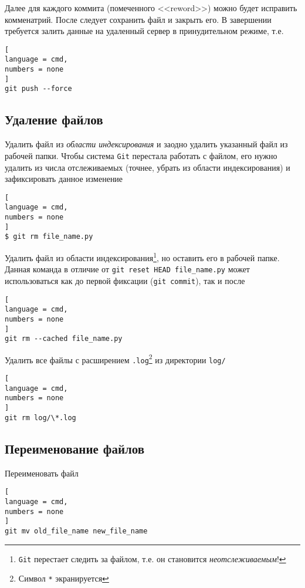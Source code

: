 \documentclass[%
	11pt,
	a4paper,
	utf8,
		]{article}
\begin{document}
Далее для каждого коммита (помеченного <<reword>>) можно будет исправить комменатрий. После следует сохранить файл и закрыть его. В завершении требуется залить данные на удаленный сервер в принудительном режиме, т.е.
\begin{lstlisting}[
language = cmd,
numbers = none
]
git push --force
\end{lstlisting}


\subsection{Удаление файлов}

Удалить файл из \emph{области индексирования} и заодно удалить указанный файл из рабочей папки. Чтобы система \texttt{Git} перестала работать с файлом, его нужно удалить из числа отслеживаемых (точнее, убрать из области индексирования) и зафиксировать данное изменение 

\begin{lstlisting}[
language = cmd,
numbers = none
]
$ git rm file_name.py
\end{lstlisting}


Удалить файл из области индексирования\footnote{\texttt{Git} перестает следить за файлом, т.е. он становится \emph{неотслеживаемым}!}, но оставить его в рабочей папке. Данная команда в отличие от \texttt{git reset HEAD file\_name.py} может использоваться как до первой фиксации (\texttt{git commit}), так и после

\begin{lstlisting}[
language = cmd,
numbers = none
]
git rm --cached file_name.py
\end{lstlisting}


Удалить все файлы с расширением \texttt{.log}\footnote{Символ \texttt{*} экранируется} из директории \texttt{log/}

\begin{lstlisting}[
language = cmd,
numbers = none
]
git rm log/\*.log
\end{lstlisting}


\subsection{Переименование файлов}

Переименовать файл

\begin{lstlisting}[
language = cmd,
numbers = none
]
git mv old_file_name new_file_name
\end{lstlisting}
\end{document}
